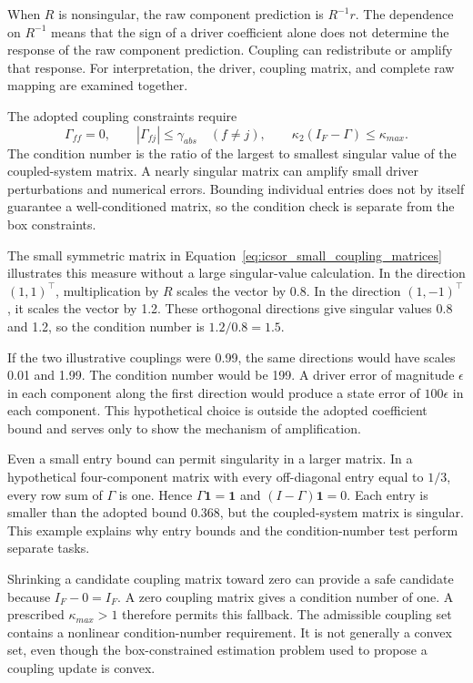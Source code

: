 When \(R\) is nonsingular, the raw component prediction is \(R^{-1}r\). The dependence on \(R^{-1}\) means that the sign of a driver coefficient alone does not determine the response of the raw component prediction. Coupling can redistribute or amplify that response. For interpretation, the driver, coupling matrix, and complete raw mapping are examined together.

The adopted coupling constraints require
\begin{equation}
\label{eq:icsor_coupling_safeguards}
\Gamma_{ff}=0,
\qquad |\Gamma_{fj}|\leq\gamma_{abs}\quad(f\neq j),
\qquad \kappa_2(I_F-\Gamma)\leq\kappa_{max}.
\end{equation}
The condition number is the ratio of the largest to smallest singular value of the coupled-system matrix. A nearly singular matrix can amplify small driver perturbations and numerical errors. Bounding individual entries does not by itself guarantee a well-conditioned matrix, so the condition check is separate from the box constraints.

The small symmetric matrix in Equation~\eqref{eq:icsor_small_coupling_matrices} illustrates this measure without a large singular-value calculation. In the direction \((1,1)^\top\), multiplication by \(R\) scales the vector by 0.8. In the direction \((1,-1)^\top\), it scales the vector by 1.2. These orthogonal directions give singular values 0.8 and 1.2, so the condition number is \(1.2/0.8=1.5\).

If the two illustrative couplings were 0.99, the same directions would have scales 0.01 and 1.99. The condition number would be 199. A driver error of magnitude \(\epsilon\) in each component along the first direction would produce a state error of \(100\epsilon\) in each component. This hypothetical choice is outside the adopted coefficient bound and serves only to show the mechanism of amplification.

Even a small entry bound can permit singularity in a larger matrix. In a hypothetical four-component matrix with every off-diagonal entry equal to \(1/3\), every row sum of \(\Gamma\) is one. Hence \(\Gamma\mathbf{1}=\mathbf{1}\) and \((I-\Gamma)\mathbf{1}=0\). Each entry is smaller than the adopted bound 0.368, but the coupled-system matrix is singular. This example explains why entry bounds and the condition-number test perform separate tasks.

Shrinking a candidate coupling matrix toward zero can provide a safe candidate because \(I_F-0=I_F\). A zero coupling matrix gives a condition number of one. A prescribed \(\kappa_{max}>1\) therefore permits this fallback. The admissible coupling set contains a nonlinear condition-number requirement. It is not generally a convex set, even though the box-constrained estimation problem used to propose a coupling update is convex.

